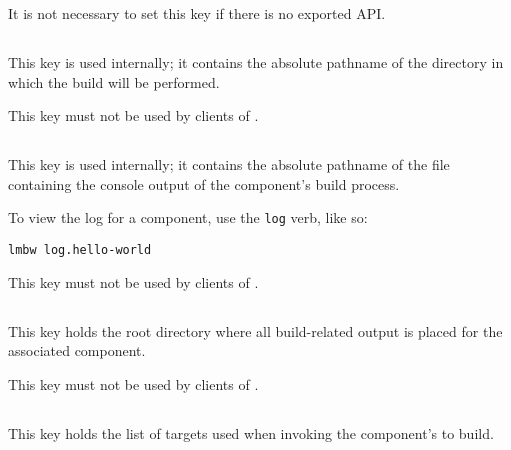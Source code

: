 It is not necessary to set this key if there is no exported API.


\subsection{}\label{variables:build-directory}

This key is used internally; it contains the absolute pathname of the
directory in which the build will be performed.

This key must not be used by clients of \lmsbw.


\subsection{}\label{variables:build-log}

This key is used internally; it contains the absolute pathname of the
file containing the console output of the component's build process.

To view the log for a component, use the \texttt{log} verb, like so:

\begin{verbatim}
lmbw log.hello-world
\end{verbatim}

This key must not be used by clients of \lmsbw.


\subsection{}\label{variables:build-root-directory}

This key holds the root directory where all build-related output is
placed for the associated component.

This key must not be used by clients of \lmsbw.


\subsection{}\label{variables:build-target}

This key holds the list of targets used when invoking the component's
\makefile to build.

